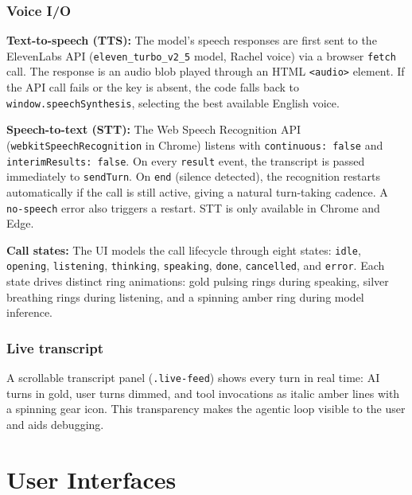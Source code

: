 \documentclass[12pt,a4paper,oneside]{report}
\begin{document}
\subsubsection{Voice I/O}

\textbf{Text-to-speech (TTS):}
The model's speech responses are first sent to the ElevenLabs API
(\texttt{eleven\_turbo\_v2\_5} model, Rachel voice) via a browser
\texttt{fetch} call. The response is an audio blob played through an HTML
\texttt{<audio>} element. If the API call fails or the key is absent, the
code falls back to \texttt{window.speechSynthesis}, selecting the best
available English voice.

\textbf{Speech-to-text (STT):}
The Web Speech Recognition API (\texttt{webkitSpeechRecognition} in
Chrome) listens with \texttt{continuous: false} and
\texttt{interimResults: false}. On every \texttt{result} event, the
transcript is passed immediately to \texttt{sendTurn}. On \texttt{end}
(silence detected), the recognition restarts automatically if the call is
still active, giving a natural turn-taking cadence. A \texttt{no-speech}
error also triggers a restart. STT is only available in Chrome and Edge.

\textbf{Call states:}
The UI models the call lifecycle through eight states:
\texttt{idle}, \texttt{opening}, \texttt{listening}, \texttt{thinking},
\texttt{speaking}, \texttt{done}, \texttt{cancelled}, and \texttt{error}.
Each state drives distinct ring animations: gold pulsing rings during
speaking, silver breathing rings during listening, and a spinning amber
ring during model inference.

\subsubsection{Live transcript}

A scrollable transcript panel (\texttt{.live-feed}) shows every turn in
real time: AI turns in gold, user turns dimmed, and tool invocations as
italic amber lines with a spinning gear icon. This transparency makes the
agentic loop visible to the user and aids debugging.

\section{User Interfaces}

\end{document}
